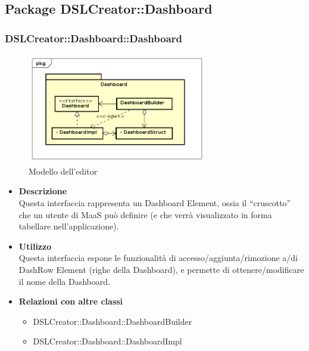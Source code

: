         \subsection{Package DSLCreator::Dashboard}
                \subsubsection{DSLCreator::Dashboard::Dashboard}
                \begin{figure}[H]
                  \centering
                  \includegraphics[width=0.7\textwidth]{res/img/Dashboard.png}
                  \caption{Modello dell'editor}
                  \label{fig:diagram_model}
                \end{figure}
                    \begin{itemize}
                        \item \textbf{Descrizione} \hfill \\
                            Questa interfaccia rappresenta un Dashboard Element, ossia il ``cruscotto'' che un utente di MaaS può definire (e che verrà visualizzato in forma tabellare nell'applicazione).
                        \item \textbf{Utilizzo}  \hfill \\
                            Questa interfaccia espone le funzionalità di accesso/aggiunta/rimozione a/di DashRow Element (righe della Dashboard), e permette di ottenere/modificare il nome della Dashboard.
                        \item \textbf{Relazioni con altre classi} \hfill 
                            \begin{itemize}
                              \item DSLCreator::Dashboard::DashboardBuilder
                              \item DSLCreator::Dashboard::DashboardImpl
                            \end{itemize}
                    \end{itemize}

